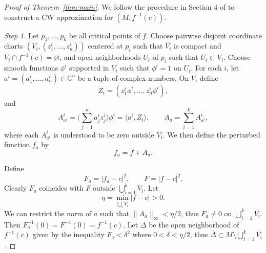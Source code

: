 \documentclass[11pt]{amsart}
\theoremstyle{plain}
\theoremstyle{definition}
\theoremstyle{remark}
\numberwithin{equation}{section}
\begin{document}
\begin{proof}[Proof of Theorem~\ref{thm:main}]
    We follow the procedure in Section 4 of \cite{Broughton1988} to construct a CW approximation for $(M, f^{-1}(c))$.

    \medskip
    \noindent\emph{Step 1.}
    Let $p_1, \ldots, p_k$ be all critical points of $f$.
    Choose pairwise disjoint coordinate charts $(V_i, (z^i_1, \ldots, z^i_n))$ centered at $p_i$ such that $\overline{V_i}$ is compact and $\overline{V_i} \cap f^{-1}(c) = \varnothing$, and open neighborhoods $U_i$ of $p_i$ such that $\overline{U_i} \subset V_i$.
    Choose smooth functions $\phi^i$ supported in $V_i$ such that $\phi^i = 1$ on $U_i$.
    For each $i$, let $a^i = (a^i_1, \ldots, a^i_n) \in \mathbb{C}^n$ be a tuple of complex numbers.
    On $V_i$ define
    \begin{equation}
        Z_i = (z^i_1 \phi^i, \ldots, z^i_n \phi^i),
    \end{equation}
    and
    \begin{equation}
        A^i_{a^i} = \biggl( \sum_{j=1}^{n} a^i_j z^i_j \biggr) \phi^i = \langle a^i, Z_i \rangle, \qquad A_a = \sum_{i=1}^{k} A^i_{a^i},
    \end{equation}
    where each $A^i_{a^i}$ is understood to be zero outside $V_i$.
    We then define the perturbed function $f_a$ by
    \begin{equation}
        f_a = f + A_a.
    \end{equation}

    Define
    \begin{equation}
        F_a = |f_a - c|^2, \qquad F = |f - c|^2.
    \end{equation}
    Clearly $F_a$ coincides with $F$ outside $\bigcup_{i=1}^{k} V_i$.
    Let
    \begin{equation*}
        \eta = \min_{\bigcup_i \overline{V_i}} |f - c| > 0.
    \end{equation*}
    We can restrict the norm of $a$ such that $\|A_a\|_\infty < \eta/2$, thus $F_a \neq 0$ on $\bigcup_{i=1}^{k} \overline{V_i}$.
    Then $F_a^{-1}(0) = F^{-1}(0) = f^{-1}(c)$.
    Let $\Delta$ be the open neighborhood of $f^{-1}(c)$ given by the inequality $F_a < \delta^2$ where $0 < \delta < \eta/2$, thus $\overline{\Delta} \subset M \setminus \bigcup_{i=1}^{k} \overline{V_i}$.


\end{proof}
\end{document}
